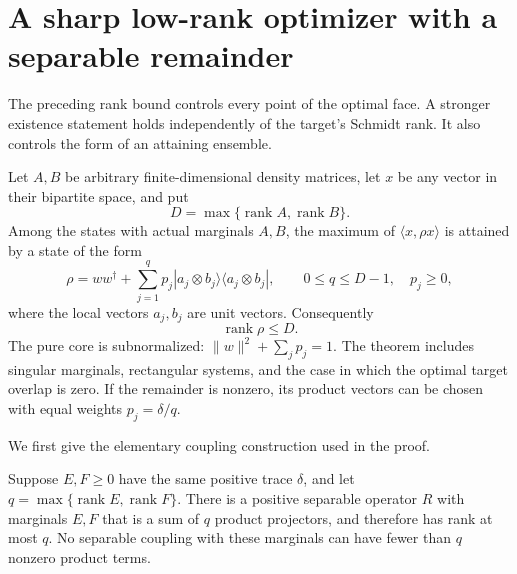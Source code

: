 \section{A sharp low-rank optimizer with a separable remainder}
\label{sec:low-rank-optimizer}

The preceding rank bound controls every point of the optimal face. A stronger
existence statement holds independently of the target's Schmidt rank. It also
controls the form of an attaining ensemble.

\begin{theorem}
\label{thm:low-rank-pure-target}
Let $A,B$ be arbitrary finite-dimensional density matrices, let $x$ be any
vector in their bipartite space, and put
\[
                 D=\max\{\operatorname{rank}A,\operatorname{rank}B\}.
\]
Among the states with actual marginals $A,B$, the maximum of
$\langle x,\rho x\rangle$ is attained by a state of the form
\[
 \boxed{\quad
 \rho=ww^\dagger+\sum_{j=1}^{q}p_j
                 |a_j\otimes b_j\rangle\langle a_j\otimes b_j|,
 \qquad 0\le q\le D-1,\quad p_j\ge0,
 \quad}
\]
where the local vectors $a_j,b_j$ are unit vectors. Consequently
\[
                         \boxed{\operatorname{rank}\rho\le D.}
\]
The pure core is subnormalized: $\|w\|^2+\sum_jp_j=1$.
The theorem includes singular marginals, rectangular systems, and the case
in which the optimal target overlap is zero. If the remainder is nonzero,
its product vectors can be chosen with equal weights $p_j=\delta/q$.
\end{theorem}

We first give the elementary coupling construction used in the proof.

\begin{lemma}
\label{lem:fourier-separable-coupling}
Suppose $E,F\ge0$ have the same positive trace $\delta$, and let
$q=\max\{\operatorname{rank}E,\operatorname{rank}F\}$. There is a
positive separable operator $R$ with marginals $E,F$ that is a sum of $q$
product projectors, and therefore has rank at most $q$. No separable
coupling with these marginals can have fewer than $q$ nonzero product
terms.
\end{lemma}

